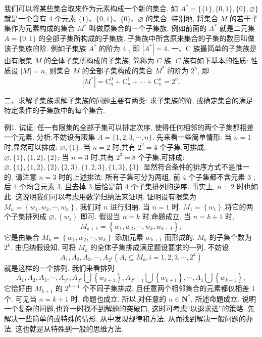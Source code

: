 
我们可以将某些集合取来作为元素构成一个新的集合, 如 $A^*=\{\{1\},\{0,1\},\{0\}, \varnothing\}$ 就是一个含有 4 个元素 $\{1\} 、\{0,1\} 、\{0\} 、 \varnothing$ 的集合.
特别地, 将集合 $M$ 的若干子集作为元素构成的集合 $M^*$ 叫做原集合的一个子集族.
例如前面的 $A^*$ 就是二元集 $A=\{0,1\}$ 的全部子集所构成的子集族.
子集族中所含原来集合的子集的数目叫做该子集族的阶.
例如子集族 $A^*$ 的阶为 4 , 即 $\left|A^*\right|=4$.
一、C 族最简单的子集族是由有限集 $M$ 的全体子集所构成的子集族, 简称为 $C$ 族.
$C$ 族有如下基本的性质:
性质设 $|M|=n$, 则集合 $M$ 的全部子集构成的集合 $M^*$ 的阶为 $2^n$, 即
$$
\left|M^*\right|=\mathrm{C}_n^0+\mathrm{C}_n^1+\cdots+\mathrm{C}_n^n=2^n .
$$



二、求解子集族求解子集族的问题主要有两类: 求子集族的阶, 或确定集合的满足特定条件的子集族中的每个集合.



例1. 试证: 任一有限集的全部子集可以排定次序, 使得任何相邻的两个子集都相差一个元素.
分析:不妨设有限集 $A=\{1,2,3, \cdots, n\}$. 先来看一些简单情形:
当 $n=1$ 时,显然可以排成: $\varnothing,\{1\}$;
当 $n=2$ 时,共有 $2^2=4$ 个子集,可排成: $\varnothing,\{1\},\{1,2\},\{2\}$;
当 $n=3$ 时,共有 $2^3=8$ 个子集,可排成: $\varnothing,\{1\},\{1,2\},\{2\},\{2,3\},\{1,2,3\},\{1,3\},\{3\}$.
显然符合条件的排序方式不是惟一的.
请注意 $n=3$ 时的上述排法: 所有子集可分为两组, 前 4 个子集都不含元素 3 ; 后 4 个均含元素 3, 且去掉 3 后恰是前 4 个子集排列的逆序.
事实上, $n=2$ 时也如此.
这说明我们可以考虑用数学归纳法来证明.
证明设有限集为 $M_n=\left\{w_1, w_2, \cdots, w_n\right\}$, 我们对 $n$ 进行归纳.
当 $n=1$ 时, $M_1=\left\{w_1\right\}$,将它的两个子集排列成 $\varnothing,\left\{w_1\right\}$ 即可.
假设当 $n=k$ 时,命题成立.
当 $n=k+1$ 时,
$$
M_{k+1}=\left\{w_1, w_2, \cdots, w_k, w_{k+1}\right\},
$$
它是由集合 $M_k=\left\{w_1, w_2, \cdots, w_k\right\}$ 添加元素 $w_{k+1}$ 而形成的.
$M_k$ 的子集个数为 $2^k$. 由归纳假设知, 可将 $M_k$ 的全体子集排成满足题设要求的一列, 不妨设
$$
A_1, A_2, A_3, \cdots, A_{2^k}\left(A_i \subseteq M_k, i=1,2,3, \cdots, 2^k\right)
$$
就是这样的一个排列.
我们来看排列
$$
A_1, A_2, A_3, \cdots, A_{2^k}, A_{2^k} \bigcup\left\{w_{k+1}\right\}, A_{2^k-1} \bigcup\left\{w_{k+1}\right\}, \cdots, A_1 \bigcup\left\{w_{k+1}\right\},
$$
它恰好由 $M_{k+1}$ 的 $2^{k+1}$ 个不同子集排成, 且任意两个相邻集合的元素都仅相差 1 个.
可见当 $n=k+1$ 时, 命题也成立.
所以,对任意的 $n \in \mathbf{N}^*$, 所述命题成立.
说明一个复杂的问题,也许一时找不到解题的突破口, 这时可考虑“以退求进”的策略.
先解决一些简单的或特殊的情形, 从中发现规律和方法, 从而找到解决一般问题的办法.
这也就是从特殊到一般的思维方法.



